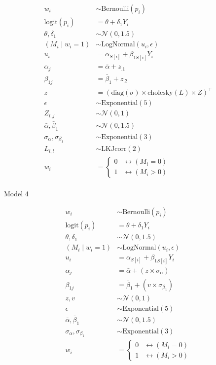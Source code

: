 \documentclass[
  letterpaper,
  DIV=11,
  numbers=noendperiod]{scrartcl}
\makeatletter
\let\oldparagraph\paragraph
\renewcommand{\paragraph}{
    \@ifstar
      \xxxParagraphStar
      \xxxParagraphNoStar
  }
\newcommand{\xxxParagraphStar}[1]{\oldparagraph*{#1}\mbox{}}
\newcommand{\xxxParagraphNoStar}[1]{\oldparagraph{#1}\mbox{}}
\makeatother
\begin{document}
\[
\begin{aligned}
w_i &\sim \mathrm{Bernoulli}(p_i) \\
\text{logit}(p_i) &= \theta + \delta_1 Y_i \\
\theta, \delta_1 &\sim \mathcal{N}(0, 1.5) \\
(M_i \mid w_i = 1) &\sim \mathrm{LogNormal}(u_i, \epsilon) \\
u_i &= \alpha_{S[i]} + \beta_{1S[i]} Y_i \\
\alpha_j &= \bar{\alpha} + z_{.1} \\
\beta_{1j} &= \bar{\beta}_1 + z_{.2} \\
z &= \left( \mathrm{diag}(\sigma) \times \mathrm{cholesky}(L) \times Z \right)^\top \\
\epsilon &\sim \mathrm{Exponential}(5) \\
Z_{l,j} &\sim \mathcal{N}(0, 1) \\
\bar{\alpha}, \bar{\beta}_1 &\sim \mathcal{N}(0, 1.5) \\
\sigma_{\alpha}, \sigma_{\beta_1} &\sim \mathrm{Exponential}(3) \\
L_{l,l} &\sim \mathrm{LKJcorr}(2) \\
w_i &=
\begin{cases}
0 & \leftrightarrow (M_i = 0) \\
1 & \leftrightarrow (M_i > 0)
\end{cases}
\end{aligned}
\]

\paragraph{Model 4}\label{model-4}

\[
\begin{aligned}
w_i &\sim \mathrm{Bernoulli}(p_i) \\
\text{logit}(p_i) &= \theta + \delta_1 Y_i \\
\theta, \delta_1 &\sim \mathcal{N}(0, 1.5) \\
(M_i \mid w_i = 1) &\sim \mathrm{LogNormal}(u_i, \epsilon) \\
u_i &= \alpha_{S[i]} + \beta_{1S[i]} Y_i \\
\alpha_j &= \bar{\alpha} + (z \times \sigma_\alpha) \\
\beta_{1j} &= \bar{\beta}_1 + (v \times \sigma_{\beta_1}) \\
z, v &\sim \mathcal{N}(0, 1) \\
\epsilon &\sim \mathrm{Exponential}(5) \\
\bar{\alpha}, \bar{\beta}_1 &\sim \mathcal{N}(0, 1.5) \\
\sigma_\alpha, \sigma_{\beta_1} &\sim \mathrm{Exponential}(3) \\
w_i &=
\begin{cases}
0 & \leftrightarrow (M_i = 0) \\
1 & \leftrightarrow (M_i > 0)
\end{cases}
\end{aligned}
\]
\end{document}

